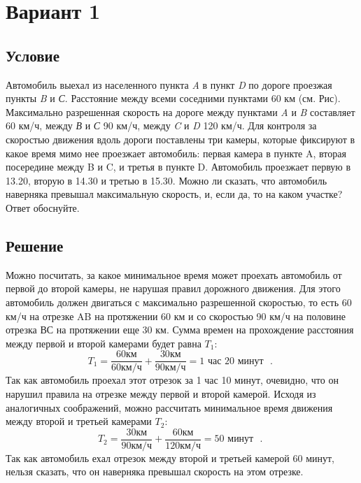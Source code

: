 
%
\setlength{\parindent}{12pt}
\setlength{\parskip}{0pt}


\section*{Вариант 1}

\subsection*{Условие}

Автомобиль выехал из населенного пункта \textit{A} в пункт \textit{D} по дороге проезжая пункты \textit{B} и \textit{С}. Расстояние между всеми соседними пунктами 60 км (см. Рис). Максимально разрешенная скорость на дороге между пунктами \textit{A} и \textit{B} составляет 60 км/ч, между \textit{В} и \textit{С} 90 км/ч, между \textit{C} и \textit{D} 120 км/ч. Для контроля за скоростью движения вдоль дороги поставлены три камеры, которые фиксируют в какое время мимо нее проезжает автомобиль: первая камера в пункте A, вторая посередине между B и C, и третья в пункте D. Автомобиль проезжает первую в 13.20, вторую в 14.30 и третью в 15.30. Можно ли сказать, что автомобиль наверняка превышал максимальную скорость, и, если да, то на каком участке? Ответ обоснуйте.

\subsection*{Решение}
     Можно посчитать, за какое минимальное время может проехать автомобиль от первой до второй камеры, не нарушая правил дорожного движения. Для этого автомобиль должен двигаться с максимально разрешенной скоростью, то есть 60 км/ч на отрезке AB на протяжении 60 км и со скоростью 90 км/ч на половине отрезка ВС на протяжении еще 30 км. Сумма времен на прохождение расстояния между первой и второй камерами будет равна $T_1$:
     \begin{equation}
     T_1 = \frac{60 \mbox{км}}{60 \mbox{км/ч}} + \frac{30 \mbox{км}}{90 \mbox{км/ч}} = 1 \mbox{ час } 20 \mbox{ минут } \mbox{ . }
     \end{equation}
Так как автомобиль проехал этот отрезок за 1 час 10 минут, очевидно, что он нарушил правила на отрезке между первой и второй камерой. Исходя из аналогичных соображений, можно рассчитать минимальное время движения между второй и третьей камерами $T_2$:
     \begin{equation}
     T_2 = \frac{30 \mbox{км}}{90 \mbox{км/ч}} + \frac{60 \mbox{км}}{120 \mbox{км/ч}} = 50 \mbox{ минут } \mbox{ . }
     \end{equation}
Так как автомобиль ехал отрезок между второй и третьей камерой 60 минут, нельзя сказать, что он наверняка превышал скорость на этом отрезке.

